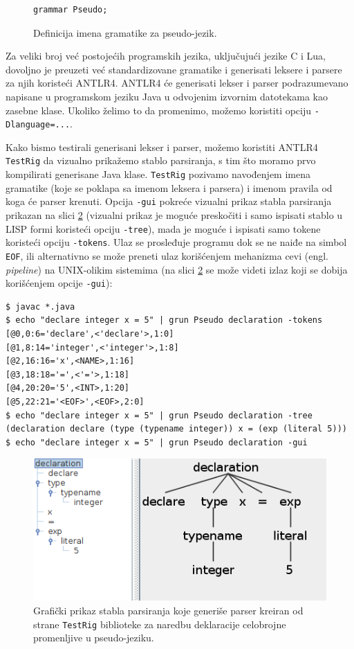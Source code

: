 \begin{figure}[h!]
\begin{lstlisting}[language={}]
grammar Pseudo;
\end{lstlisting}
\caption{Definicija imena gramatike za pseudo-jezik.}
\label{fig:PseudoDef9}
\end{figure}


Za veliki broj već postojećih programskih jezika, uključujući jezike C i Lua, dovoljno je preuzeti već standardizovane gramatike i generisati leksere i parsere za njih koristeći ANTLR4. ANTLR4 će generisati lekser i parser podrazumevano napisane u programskom jeziku Java u odvojenim izvornim datotekama kao zasebne klase. Ukoliko želimo to da promenimo, možemo koristiti opciju \texttt{-Dlanguage=...}.

Kako bismo testirali generisani lekser i parser, možemo koristiti ANTLR4 \texttt{TestRig} da vizualno prikažemo stablo parsiranja, s tim što moramo prvo kompilirati generisane Java klase. \texttt{TestRig} pozivamo navođenjem imena gramatike (koje se poklapa sa imenom leksera i parsera) i imenom pravila od koga će parser krenuti. Opcija \texttt{-gui} pokreće vizualni prikaz stabla parsiranja prikazan na slici \ref{fig:PseudoTreeGui} (vizualni prikaz je moguće preskočiti i samo ispisati stablo u LISP formi koristeći opciju \texttt{-tree}), mada je moguće i ispisati samo tokene koristeći opciju \texttt{-tokens}. Ulaz se prosleđuje programu dok se ne naiđe na simbol \texttt{EOF}, ili alternativno se može preneti ulaz korišćenjem mehanizma cevi (engl. \emph{pipeline}) na UNIX-olikim sistemima (na slici \ref{fig:PseudoTreeGui} se može videti izlaz koji se dobija korišćenjem opcije \texttt{-gui}):
\begin{lstlisting}[language={}]
$ javac *.java
$ echo "declare integer x = 5" | grun Pseudo declaration -tokens
[@0,0:6='declare',<'declare'>,1:0]
[@1,8:14='integer',<'integer'>,1:8]
[@2,16:16='x',<NAME>,1:16]
[@3,18:18='=',<'='>,1:18]
[@4,20:20='5',<INT>,1:20]
[@5,22:21='<EOF>',<EOF>,2:0]
$ echo "declare integer x = 5" | grun Pseudo declaration -tree
(declaration declare (type (typename integer)) x = (exp (literal 5)))
$ echo "declare integer x = 5" | grun Pseudo declaration -gui
\end{lstlisting}    

\begin{figure}[h!]
\centering
\includegraphics[scale=0.8]{images/pseudo_parse_tree.png}
\caption{Grafički prikaz stabla parsiranja koje generiše parser kreiran od strane \texttt{TestRig} biblioteke za naredbu deklaracije celobrojne promenljive u pseudo-jeziku.}
\label{fig:PseudoTreeGui}
\end{figure}



